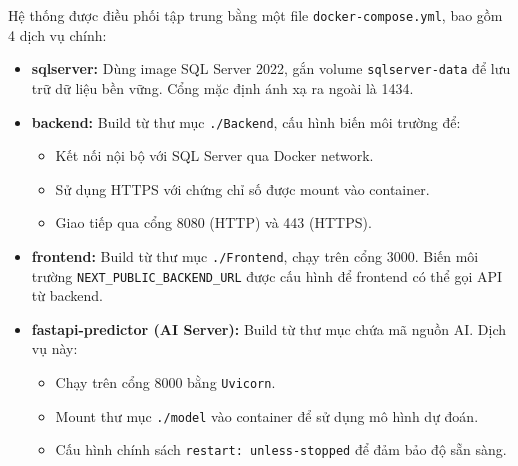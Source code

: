 \begin{enumerate}
    Hệ thống được điều phối tập trung bằng một file \texttt{docker-compose.yml}, bao gồm 4 dịch vụ chính:

    \begin{itemize}[label=--]
        \item \textbf{sqlserver:} Dùng image SQL Server 2022, gắn volume \texttt{sqlserver-data} để lưu trữ dữ liệu bền vững. Cổng mặc định ánh xạ ra ngoài là 1434.
        
        \item \textbf{backend:} Build từ thư mục \texttt{./Backend}, cấu hình biến môi trường để:
        \begin{itemize}[label=\textbullet]
            \item Kết nối nội bộ với SQL Server qua Docker network.
            \item Sử dụng HTTPS với chứng chỉ số được mount vào container.
            \item Giao tiếp qua cổng 8080 (HTTP) và 443 (HTTPS).
        \end{itemize}
        
        \item \textbf{frontend:} Build từ thư mục \texttt{./Frontend}, chạy trên cổng 3000. Biến môi trường \texttt{NEXT\_PUBLIC\_BACKEND\_URL} được cấu hình để frontend có thể gọi API từ backend.
        
        \item \textbf{fastapi-predictor (AI Server):} Build từ thư mục chứa mã nguồn AI. Dịch vụ này:
        \begin{itemize}[label=\textbullet]
            \item Chạy trên cổng 8000 bằng \texttt{Uvicorn}.
            \item Mount thư mục \texttt{./model} vào container để sử dụng mô hình dự đoán.
            \item Cấu hình chính sách \texttt{restart: unless-stopped} để đảm bảo độ sẵn sàng.
        \end{itemize}
    \end{itemize}
\end{enumerate}


